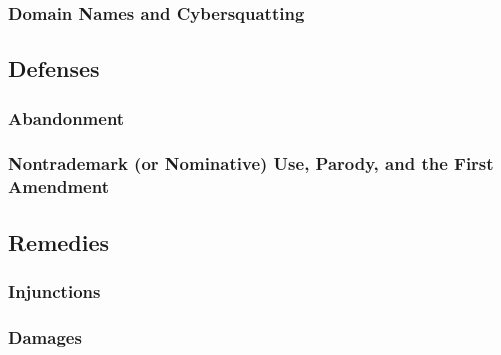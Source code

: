 
\subsubsection{Domain Names and Cybersquatting}


\subsection{Defenses}

\subsubsection{Abandonment}


\subsubsection{Nontrademark (or Nominative) Use, Parody, and the First 
Amendment}


\subsection{Remedies}

\subsubsection{Injunctions}


\subsubsection{Damages}

